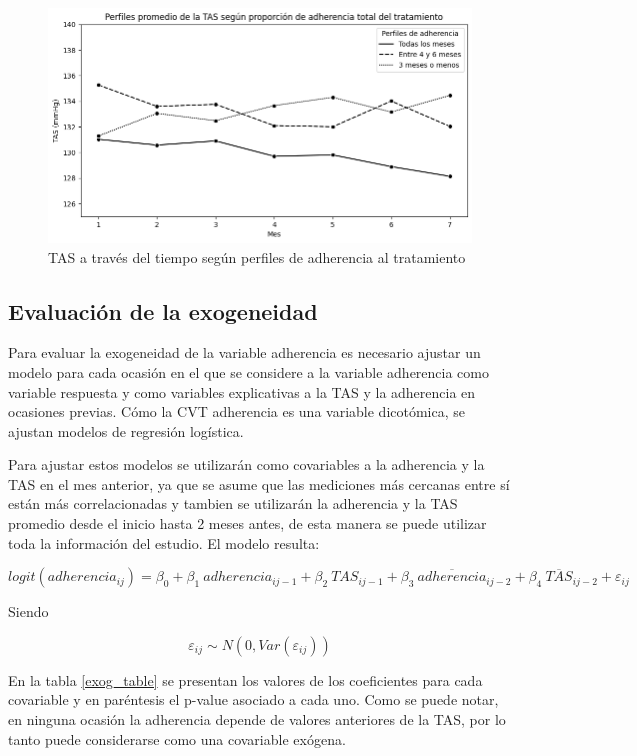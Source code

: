 \documentclass[spanish]{article}
\numberwithin{figure}{subsection}
\numberwithin{equation}{subsection}
\numberwithin{table}{subsection}
\begin{document}
\begin{figure}[H]
	\centering
	\includegraphics[scale=0.5]{img/TAS_vs_tpo_with_adherencia.png}
	\caption{TAS a través del tiempo según perfiles de adherencia al tratamiento}
	\label{TAS_with_adh}
\end{figure}

\subsection{Evaluación de la exogeneidad}

Para evaluar la exogeneidad de la variable adherencia es necesario ajustar un
modelo para cada ocasión en el que se considere a la variable adherencia como
variable respuesta y como variables explicativas a la TAS y la adherencia en
ocasiones previas. Cómo la CVT adherencia es una variable dicotómica, se ajustan
modelos de regresión logística.

Para ajustar estos modelos se utilizarán como covariables a la adherencia y la
TAS en el mes anterior, ya que se asume que las mediciones más cercanas entre sí
están más correlacionadas y tambien se utilizarán la adherencia y la TAS
promedio desde el inicio hasta 2 meses antes, de esta manera se puede utilizar
toda la información del estudio. El modelo resulta:

\[ 
	logit(adherencia_{ij}) = \beta_0 + \beta_1\ adherencia_{ij-1} + \beta_2\ TAS_{ij-1}
	+ \beta_3\ \overline{adherencia}_{ij-2} + \beta_4\ \overline{TAS}_{ij-2} + \varepsilon_{ij}
\]

Siendo

\[ \varepsilon_{ij} \sim N(0, Var(\varepsilon_{ij})) \]

En la tabla \ref{exog_table} se presentan los valores de los coeficientes para
cada covariable y en paréntesis el p-value asociado a cada uno. Como se puede
notar, en ninguna ocasión la adherencia depende de valores anteriores de la TAS,
por lo tanto puede considerarse como una covariable exógena.
\end{document}
